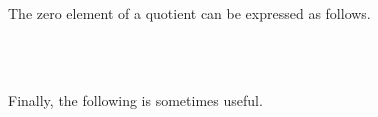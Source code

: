 The zero element of a quotient can be expressed as follows.
\ccpad
\begin{code}%
\>[0][@{}l@{\AgdaIndent{0}}]%
\>[1]\AgdaSpace{}%
\AgdaSymbol{:}\AgdaSpace{}%
\AgdaSymbol{\{}\AgdaSpace{}%
\AgdaSymbol{:}\AgdaSpace{}%
\AgdaSpace{}%
\AgdaSpace{}%
\AgdaSymbol{\}(}\AgdaSpace{}%
\AgdaSymbol{:}\AgdaSpace{}%
\AgdaSymbol{\{}\AgdaSymbol{\}\{}\AgdaSymbol{\}}\AgdaSpace{}%
\AgdaSymbol{)}\AgdaSpace{}%
\AgdaSpace{}%
\AgdaSpace{}%
\AgdaSymbol{(}\AgdaSpace{}%
\AgdaSpace{}%
\AgdaSpace{}%
\AgdaOperator{\AgdaFunction{/}}\AgdaSpace{}%
\AgdaSpace{}%
\AgdaSpace{}%
\AgdaSymbol{)(}\AgdaSpace{}%
\AgdaSpace{}%
\AgdaSpace{}%
\AgdaSymbol{)}\<%
\\
%
\\[\AgdaEmptyExtraSkip]%
%
\>[1]\AgdaSpace{}%
\AgdaSpace{}%
\AgdaSymbol{=}\AgdaSpace{}%
\AgdaSpace{}%
\AgdaSpace{}%
\AgdaSpace{}%
\AgdaSpace{}%
\AgdaSpace{}%
\AgdaSpace{}%
\<%
\end{code}
\ccpad
Finally, the following  is sometimes useful.
\ccpad
